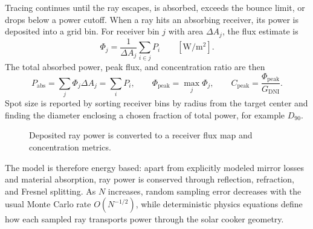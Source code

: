 Tracing continues until the ray escapes, is absorbed, exceeds the bounce limit, or drops below
a power cutoff.  When a ray hits an absorbing receiver, its power is deposited into a grid bin.
For receiver bin $j$ with area $\Delta A_j$, the flux estimate is
\begin{equation}
  \Phi_j = \frac{1}{\Delta A_j}\sum_{i\in j} P_i
  \qquad [\mathrm{W/m^2}].
\end{equation}
The total absorbed power, peak flux, and concentration ratio are then
\begin{equation}
  P_\mathrm{abs} = \sum_j \Phi_j \Delta A_j
  = \sum_i P_i,\qquad
  \Phi_\mathrm{peak} = \max_j \Phi_j,\qquad
  C_\mathrm{peak} = \frac{\Phi_\mathrm{peak}}{G_\mathrm{DNI}} .
\end{equation}
Spot size is reported by sorting receiver bins by radius from the target center and finding
the diameter enclosing a chosen fraction of total power, for example $D_{90}$.

\begin{figure}[h]
  \centering
  \caption{Deposited ray power is converted to a receiver flux map and concentration metrics.}
\end{figure}

The model is therefore energy based: apart from explicitly modeled mirror losses and material
absorption, ray power is conserved through reflection, refraction, and Fresnel splitting.  As
$N$ increases, random sampling error decreases with the usual Monte Carlo rate
$O(N^{-1/2})$, while deterministic physics equations define how each sampled ray transports
power through the solar cooker geometry.
